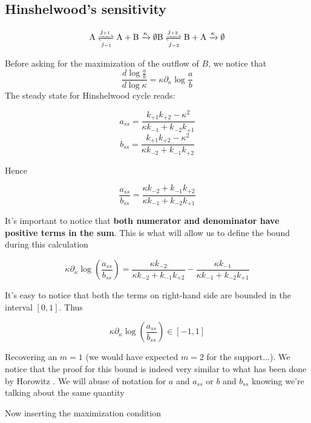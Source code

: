 \documentclass{article}
\begin{document}
	\subsection{Hinshelwood's sensitivity}
	
	\begin{center}
		\begin{equation}
			\mathrm{A} \xrightleftharpoons[j_{-1}]{j_{+1}}\mathrm{A+B}\xrightarrow{\kappa}\emptyset\\
			\mathrm{B} \xrightleftharpoons[j_{-2}]{j_{+2}}\mathrm{B+A}\xrightarrow{\kappa}\emptyset\\
		\end{equation}
	\end{center}
	
	Before asking for the maximization of the outflow of $B$, we notice that
	\begin{equation}
		\frac{d \log \frac{ a}{b} }{d \log \kappa}=\kappa \partial_{\kappa} \log \frac{ a }{b} 
	\end{equation}
	The steady state for Hinshelwood cycle reads:
	
	$$a_{ss}=\frac{k_{+1}k_{+2}-\kappa^2}{\kappa k_{-1}+k_{-2}k_{+1}}$$
	$$b_{ss}=\frac{k_{+1}k_{+2}-\kappa^2}{\kappa k_{-2}+k_{-1}k_{+2}}$$
	
	Hence
	
	$$\frac{a_{ss}}{b_{ss}}=\frac{\kappa k_{-2}+k_{-1}k_{+2}}{\kappa k_{-1}+k_{-2}k_{+1}}$$
	
	It's important to notice that \textbf{both numerator and denominator have positive terms in the sum}. This is what will allow us to define the bound during this calculation
	
	$$\kappa \partial_{\kappa}\log \left( \frac{a_{ss}}{b_{ss}}\right)=\frac{\kappa k_{-2}}{\kappa k_{-2}+k_{-1}k_{+2}}- \frac{\kappa k_{-1}}{\kappa k_{-1}+k_{-2}k_{+1}}$$
	
	It's easy to notice that both the terms on right-hand side are bounded in the interval $[0,1]$. Thus
	
	$$\kappa \partial_{\kappa}\log \left( \frac{a_{ss}}{b_{ss}}\right) \in [-1,1]$$
	
	Recovering an $m=1$ (we would have expected $m=2$ for the support...). We notice that the proof for this bound is indeed very similar to what has been done by Horowitz \cite{3}. We will abuse of notation for $a$ and $a_{ss}$ or $b$ and $b_{ss}$ knowing we're talking about the same quantity
	
	Now inserting the maximization condition 
	
\end{document}
